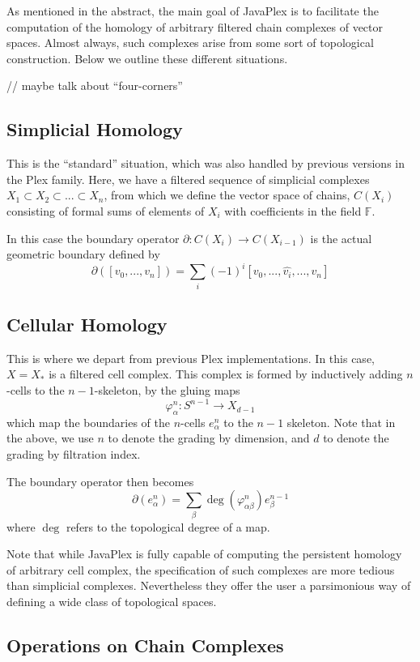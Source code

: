 \documentclass[10pt]{article}
\begin{document}
As mentioned in the abstract, the main goal of JavaPlex is to facilitate the computation of the homology of arbitrary filtered chain complexes of vector spaces. Almost always, such complexes arise from some sort of topological construction. Below we outline these different situations.

// maybe talk about ``four-corners''

\subsection{Simplicial Homology}

This is the ``standard'' situation, which was also handled by previous versions in the Plex family. Here, we have a filtered sequence of simplicial complexes $X_1 \subset X_2 \subset ... \subset X_n$, from which we define the vector space of chains, $C(X_i)$ consisting of formal sums of elements of $X_i$ with coefficients in the field $\mathbb{F}$.

In this case the boundary operator $\partial: C(X_i) \rightarrow C(X_{i-1})$ is the actual geometric boundary defined by
$$\partial([v_0, ..., v_n]) = \sum_i (-1)^i [v_0, ..., \hat{v_i}, ..., v_n]$$

\subsection{Cellular Homology}

This is where we depart from previous Plex implementations. In this case, $X = X_*$ is a filtered cell complex. This complex is formed by inductively adding $n$-cells to the $n-1$-skeleton, by the gluing maps 
$$\varphi_{\alpha}^n: S^{n-1} \rightarrow X_{d-1}$$
which map the boundaries of the $n$-cells $e_{\alpha}^n$ to the $n-1$ skeleton. Note that in the above, we use $n$ to denote the grading by dimension, and $d$ to denote the grading by filtration index.

The boundary operator then becomes 
$$\partial(e_{\alpha}^n) = \sum_{\beta} \deg(\varphi_{\alpha \beta}^n) e_{\beta}^{n-1}$$
where $\deg$ refers to the topological degree of a map.

Note that while JavaPlex is fully capable of computing the persistent homology of arbitrary cell complex, the specification of such complexes are more tedious than simplicial complexes. Nevertheless they offer the user a parsimonious way of defining a wide class of topological spaces.

\subsection{Operations on Chain Complexes}
\end{document}
